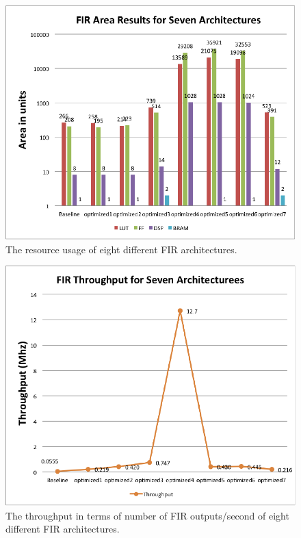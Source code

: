 \begin{figure}
\centering
%
\includegraphics[width=5in]{images/fir_area_results}
\caption{The resource usage of eight different FIR architectures.}\label{fig:fir_area_results}
\end{figure}

\begin{figure}
\centering
%
\includegraphics[width=5in]{images/fir_performance_results}
\caption{The throughput in terms of number of FIR outputs/second of eight different FIR architectures.}\label{fig:fir_performance_results}
\end{figure}

